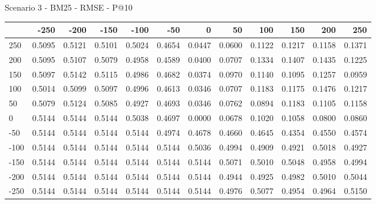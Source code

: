 Scenario 3 - BM25 - RMSE - P@10
\begin{tabular}{lrrrrrrrrrrr}
\toprule
{} &   -250 &   -200 &   -150 &   -100 &   -50  &    0   &    50  &    100 &    150 &    200 &    250 \\
\midrule
 250 & 0.5095 & 0.5121 & 0.5101 & 0.5024 & 0.4654 & 0.0447 & 0.0600 & 0.1122 & 0.1217 & 0.1158 & 0.1371 \\
 200 & 0.5095 & 0.5107 & 0.5079 & 0.4958 & 0.4589 & 0.0400 & 0.0707 & 0.1334 & 0.1407 & 0.1435 & 0.1225 \\
 150 & 0.5097 & 0.5142 & 0.5115 & 0.4986 & 0.4682 & 0.0374 & 0.0970 & 0.1140 & 0.1095 & 0.1257 & 0.0959 \\
 100 & 0.5014 & 0.5099 & 0.5097 & 0.4996 & 0.4613 & 0.0346 & 0.0707 & 0.1183 & 0.1175 & 0.1476 & 0.1217 \\
 50  & 0.5079 & 0.5124 & 0.5085 & 0.4927 & 0.4693 & 0.0346 & 0.0762 & 0.0894 & 0.1183 & 0.1105 & 0.1158 \\
 0   & 0.5144 & 0.5144 & 0.5144 & 0.5038 & 0.4697 & 0.0000 & 0.0678 & 0.1020 & 0.1058 & 0.0800 & 0.0860 \\
-50  & 0.5144 & 0.5144 & 0.5144 & 0.5144 & 0.4974 & 0.4678 & 0.4660 & 0.4645 & 0.4354 & 0.4550 & 0.4574 \\
-100 & 0.5144 & 0.5144 & 0.5144 & 0.5144 & 0.5144 & 0.5036 & 0.4994 & 0.4909 & 0.4921 & 0.5018 & 0.4927 \\
-150 & 0.5144 & 0.5144 & 0.5144 & 0.5144 & 0.5144 & 0.5144 & 0.5071 & 0.5010 & 0.5048 & 0.4958 & 0.4994 \\
-200 & 0.5144 & 0.5144 & 0.5144 & 0.5144 & 0.5144 & 0.5144 & 0.4944 & 0.4925 & 0.4982 & 0.5010 & 0.5044 \\
-250 & 0.5144 & 0.5144 & 0.5144 & 0.5144 & 0.5144 & 0.5144 & 0.4976 & 0.5077 & 0.4954 & 0.4964 & 0.5150 \\
\bottomrule
\end{tabular}

